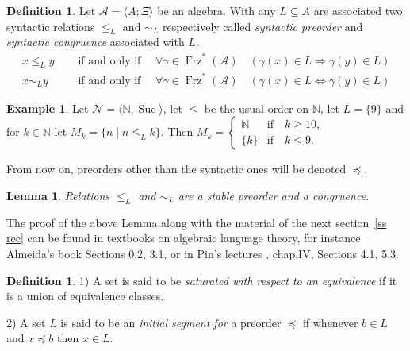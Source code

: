 \documentclass[11pt,a4paper]{article}
\newtheorem{lemma}[theorem]{Lemma}
\theoremstyle{definition} %
\newtheorem{definition}[theorem]{Definition}
\newtheorem{example}[theorem]{Example}
\newcommand\+[1]{\mathcal{#1}} %
\newcommand{\N}{{\mathbb N}}     %
\DeclareMathOperator{\freez}{Frz}%
\DeclareMathOperator{\suc}{Suc}%
\begin{document}
\begin{definition} \label{syntacticL_congruence}  
Let $\+A=\langle A;\Xi\rangle$ be an algebra. With any $L\subseteq A$   are associated two syntactic relations $\leq_L $ and $\sim_L$  respectively called {\em syntactic preorder} and  {\em syntactic congruence} associated with $L$.
\begin{subequations}
\begin{align}
x\leq_L y
\quad &{\text{ if and only if } } \quad
\forall \gamma\in  \freez^{*}(\+A)\quad (\gamma(x)\in L \Longrightarrow \gamma(y)\in L)\label{eq:sord}\\
x\sim_L y
\quad &{\text{ if and only if } } \quad
\forall \gamma\in  \freez^{*}(\+A)\quad(\gamma(x)\in L \Longleftrightarrow \gamma(y)\in L)\label{eq:scong}
\end{align}
\end{subequations}
\end{definition} 
%
\begin{example} Let $\+N=\langle \N,\suc\rangle$, let $\leq$ be the usual order on $\N$, let $L=\{9\}$ and for $k\in\N$ let $M_k=\{n \mid n \leq_L k\}$. Then
$M_k =\begin{cases}\N& \text{if}\quad k\geq 10,\\
                                  \{k\}& \text{if}  \quad k\leq 9.
                                   \end{cases}$
\end{example}
%
From now on, preorders other than the syntactic ones will be denoted $\preceq$.
\begin{lemma}
Relations $\leq_L $ and $\sim_L$  are a stable preorder and a congruence. 
\end{lemma}      
%
The proof of the above Lemma
along with the material of the next section~\ref{ss rec}
can be found in  textbooks on algebraic language theory, for instance  Almeida's book  \cite{almeida} Sections 0.2, 3.1, or
in Pin's lectures \cite{pin22}, chap.IV, Sections 4.1, 5.3.

%
\begin{definition}\label{df:satureCong} 1) A set is said to be {\em  saturated with respect to an equivalence} if it is  a union of equivalence classes. 

2) A set $L$ is said to be an {\em{initial segment for}}  a  preorder $\preceq$ if  whenever $b\in L$ and  $x\preceq b$ then $x\in L$.
\end{definition}
\end{document}
